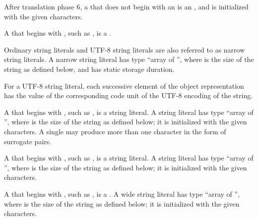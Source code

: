 \pnum
{}%
%
After translation phase 6, a  that does not begin with an  is an
, and is initialized with the given characters.

\pnum
{}%
A  that begins with ,
%
such as , is a .

\pnum
Ordinary string literals and UTF-8 string literals are
also referred to as narrow
string literals. A narrow string literal has type
%
``array of  '', where  is the size of
the string as defined below, and has static storage
duration.

\pnum
For a UTF-8 string literal, each successive element of the object
representation has the value of the corresponding
code unit of the UTF-8 encoding of the string.

\pnum
{}%
%
A  that begins with ,
%
such as , is
a  string literal. A  string literal has
type ``array of  '', where  is the
size of the string as defined below; it
is initialized with the given characters. A single  may
produce more than one  character in the form of
surrogate pairs.

\pnum
{}%
%
A  that begins with ,
%
such as , is
a  string literal. A  string literal has
type ``array of  '', where  is the
size of the string as defined below; it
is initialized with the given characters.

\pnum
{}%
A  that begins with ,
%
such as , is a .
%
%
%
%
A wide string literal has type ``array of  '', where  is the size of the string as defined below; it
is initialized with the given characters.

